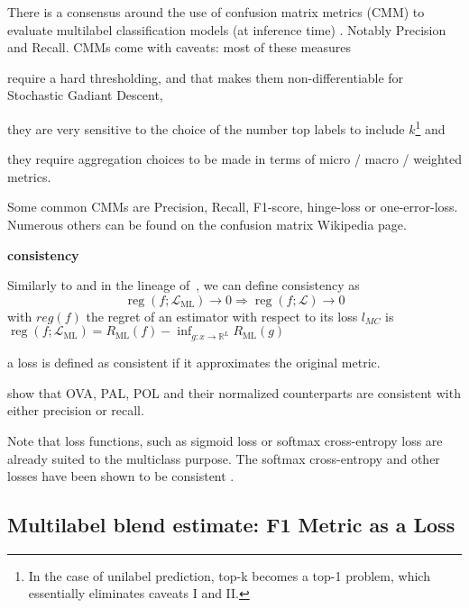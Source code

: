 There is a consensus around the use of confusion matrix metrics (CMM) to evaluate multilabel classification models (at inference time) . Notably Precision and Recall. CMMs come with caveats: most of these measures 
\begin{enumerate*}
\item require a hard thresholding, and that makes them non-differentiable for Stochastic Gadiant Descent, 
\item they are very sensitive to the choice of the number top labels to include $k$\footnote{In the case of unilabel prediction, top-k becomes a top-1 problem, which essentially eliminates caveats I and II.} and 
\item they require aggregation choices to be made in terms of micro / macro / weighted metrics.
\end{enumerate*}
Some common CMMs are Precision, Recall, F1-score, hinge-loss or one-error-loss. Numerous others can be found on the confusion matrix Wikipedia page.

\textbf{consistency}

Similarly to \citet{multilabelReduction} and in the lineage of~\citep{consistency-surrogates, consistency-multiclassSVM, consistency-lossAnalysis}, we can define consistency as
%
\begin{equation}
\operatorname{reg}\left(f ; \mathcal{L}_{\mathrm{ML}}\right) \rightarrow 0 \Longrightarrow \operatorname{reg}\left(f ; \mathcal{L}\right) \rightarrow 0
\end{equation}
%
with $reg(f)$ the regret of an estimator with respect to its loss $l_{MC}$ is $\operatorname{reg}\left(f ; \mathcal{L}_{\mathrm{ML}}\right) = R_{\mathrm{ML}}(f)-\inf _{g: x \rightarrow \mathbb{R}^{L}} R_{\mathrm{ML}}(g)$

a loss is defined as consistent if it approximates the original metric.

\citet{multilabelReduction} show that OVA, PAL, POL and their normalized counterparts are consistent with either precision or recall. 

Note that loss functions, such as sigmoid loss or softmax cross-entropy loss are already suited to the multiclass purpose. The softmax cross-entropy and other losses have been shown to be consistent \cite{consistency-multiclassSVM, consistency-lossAnalysis, consistency-surrogates}.



\subsection{Multilabel blend estimate: F1 Metric as a Loss}
\label{section:background:metricsAsLosses}

